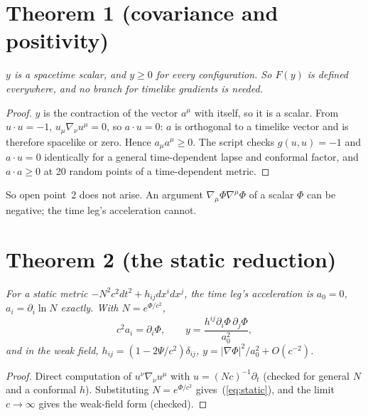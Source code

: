 \documentclass[twocolumn]{iopjournal}
\begin{document}

\section*{Theorem 1 (covariance and positivity)}

\emph{$y$ is a spacetime scalar, and $y \ge 0$ for every configuration.
So $F(y)$ is defined everywhere, and no branch for timelike gradients
is needed.}

\begin{proof}
$y$ is the contraction of the vector $a^\mu$ with itself, so it is a
scalar. From $u\cdot u = -1$, $u_\mu\nabla_\nu u^\mu = 0$, so
$a\cdot u = 0$: $a$ is orthogonal to a timelike vector and is
therefore spacelike or zero. Hence $a_\mu a^\mu \ge 0$. The script
checks $g(u,u) = -1$ and $a\cdot u = 0$ identically for a general
time-dependent lapse and conformal factor, and $a\cdot a \ge 0$ at 20
random points of a time-dependent metric.
\end{proof}

So open point~2 does not arise. An argument $\nabla_\mu\Phi\nabla^\mu\Phi$
of a scalar $\Phi$ can be negative; the time leg's acceleration
cannot.


\section*{Theorem 2 (the static reduction)}

\emph{For a static metric $-N^2c^2dt^2 + h_{ij}dx^idx^j$, the time
leg's acceleration is $a_0 = 0$, $a_i = \partial_i\ln N$ exactly. With
$N = e^{\Phi/c^2}$,
\begin{equation}
c^2 a_i = \partial_i\Phi,\qquad
y = \frac{h^{ij}\partial_i\Phi\,\partial_j\Phi}{a_0^2},
\label{eq:static}
\end{equation}
and in the weak field, $h_{ij} = (1 - 2\Psi/c^2)\delta_{ij}$,
$y = |\nabla\Phi|^2/a_0^2 + O(c^{-2})$.}

\begin{proof}
Direct computation of $u^\nu\nabla_\nu u^\mu$ with
$u = (Nc)^{-1}\partial_t$ (checked for general $N$ and a conformal
$h$). Substituting $N = e^{\Phi/c^2}$ gives~(\ref{eq:static}), and the
limit $c\to\infty$ gives the weak-field form (checked).
\end{proof}
\end{document}
